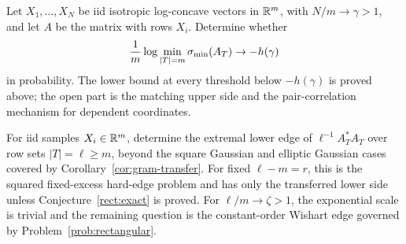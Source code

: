\begin{problem}
Let \(X_1,\dots,X_N\) be iid isotropic log-concave vectors in \(\mathbb{R}^m\), with
\(N/m\to\gamma>1\), and let \(A\) be the matrix with rows \(X_i\).  Determine
whether
\[
  \frac{1}{m}\log\min_{|T|=m}\sigma_{\min}(A_T)\to -h(\gamma)
\]
in probability.  The lower bound at every threshold below \(-h(\gamma)\) is
proved above; the open part is the matching upper side and the
pair-correlation mechanism for dependent coordinates.
\end{problem}

\begin{problem}\label{prob:sample-cov-edge}
For iid samples \(X_i\in\mathbb{R}^m\), determine the extremal lower edge of
\(\ell^{-1}A_T^*A_T\) over row sets \(|T|=\ell\ge m\), beyond the square
Gaussian and elliptic Gaussian cases covered by
Corollary~\ref{cor:gram-transfer}.  For fixed \(\ell-m=r\), this is the
squared fixed-excess hard-edge problem and has only the transferred lower side
unless Conjecture~\ref{rect:exact} is proved.  For \(\ell/m\to\zeta>1\), the
exponential scale is trivial and the remaining question is the constant-order
Wishart edge governed by Problem~\ref{prob:rectangular}.
\end{problem}
